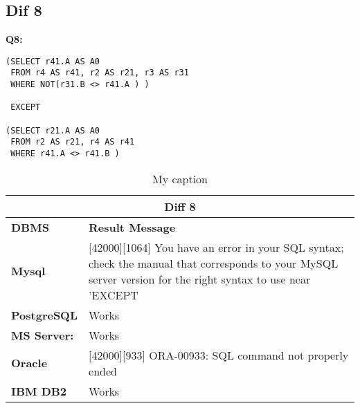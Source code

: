 \subsection{Dif 8}
  
\begin{mdframed}[backgroundcolor=gray!20] 
\textbf{Q8:}
\begin{lstlisting}
(SELECT r41.A AS A0
 FROM r4 AS r41, r2 AS r21, r3 AS r31
 WHERE NOT(r31.B <> r41.A ) )
 
 EXCEPT
 
(SELECT r21.A AS A0
 FROM r2 AS r21, r4 AS r41
 WHERE r41.A <> r41.B )
\end{lstlisting}
\end{mdframed}

\begin{table}[h]
\centering
\caption{My caption}
\label{my-label}
\begin{tabular}{|l|l|}
\hline
\multicolumn{2}{|c|}{\textbf{Diff 8}}                                                                                                                                                                                                   \\ \hline
\textbf{DBMS}                              & \textbf{Result Message}                                                                                                                                                                    \\ \hline
{\color[HTML]{333333} \textbf{Mysql}}      & {\color[HTML]{333333} {[}42000{]}{[}1064{]} You have an error in your SQL syntax; check the manual that corresponds to your MySQL server version for the right syntax to use near 'EXCEPT} \\ \hline
{\color[HTML]{333333} \textbf{PostgreSQL}} & {\color[HTML]{333333} Works}                                                                                                                                                               \\ \hline
{\color[HTML]{333333} \textbf{MS Server:}} & {\color[HTML]{333333} Works}                                                                                                                                                               \\ \hline
\textbf{Oracle}                            & {[}42000{]}{[}933{]} ORA-00933: SQL command not properly ended                                                                                                                             \\ \hline
\textbf{IBM DB2}                           & Works                                                                                                                                                                                      \\ \hline
\end{tabular}
\end{table}

